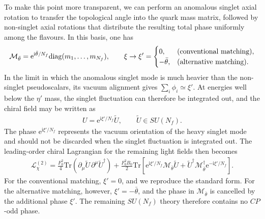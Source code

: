 \documentclass[review]{elsarticle}
\numberwithin{equation}{section}
\numberwithin{table}{section}
\numberwithin{figure}{section}
\def\i{\mathrm{i}}
\def\e{\mathrm{e}}
\def\M{\mathcal{M}}
\def\tr{\mathrm{Tr}}
\begin{document}
To make this point more transparent, we can perform an anomalous singlet axial rotation to transfer the topological angle into the quark mass matrix, followed by non-singlet axial rotations that distribute the resulting total phase uniformly among the flavours. In this basis, one has
\begin{align}
    \M_{\bar\theta} = \e^{\i\bar\theta/N_f} {\rm diag}(m_1,\ldots,m_{N_f}),
    \qquad
    \xi\to\xi' =
    \begin{cases}
    0, & \text{(conventional matching)},\\
    -\bar\theta, & \text{(alternative matching)}.
    \end{cases}
    \label{eq:chiral-mass-spurion-theta}
\end{align}
In the limit in which the anomalous singlet mode is much heavier than the non-singlet pseudoscalars, its vacuum alignment gives $\sum_i\phi_i\simeq\xi'$. At energies well below the $\eta'$ mass, the singlet fluctuation can therefore be integrated out, and the chiral field may be written as
\begin{align}
    U = \e^{\i\xi'/N_f}\widetilde U,
    \qquad
    \widetilde U\in SU(N_f). 
    \label{eq:singlet-integrated-U}
\end{align}
The phase $\e^{\i\xi'/N_f}$ represents the vacuum orientation of the heavy singlet mode and should not be discarded when the singlet fluctuation is integrated out. The leading-order chiral Lagrangian for the remaining light fields then becomes
\begin{align} 
    \mathcal{L}^{(2)}_{\chi} 
    = 
    \frac{F_0^2}{4} \tr\left( \partial_\mu\widetilde U\, \partial^\mu\widetilde U^\dagger \right) 
    + 
    \frac{F_0^2B_0}{2} \tr\left[ \e^{\i\xi'/N_f}\M_{\bar\theta}\widetilde U + \widetilde U^\dagger \M_{\bar\theta}^\dagger \e^{-\i\xi'/N_f} \right].\label{eq:chiral-Lagrangian-theta-2}
\end{align}
For the conventional matching, $\xi'=0$, and we reproduce the standard form. For the alternative matching, however, $\xi'=-\bar\theta$, and the phase in $\M_{\bar\theta}$ is cancelled by the additional phase $\xi'$. The remaining $SU(N_f)$ theory therefore contains no $CP$-odd phase.
\end{document}
